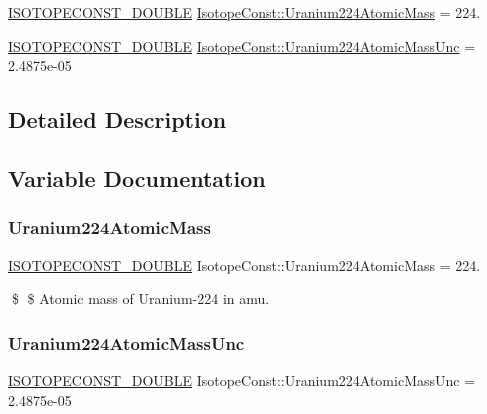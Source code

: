 \begin{DoxyCompactItemize}
\item 
\mbox{\hyperlink{group___isotope_const-_macros_ga8f45a7272ce02c0b4c65c44636ed719a}{I\+S\+O\+T\+O\+P\+E\+C\+O\+N\+S\+T\+\_\+\+D\+O\+U\+B\+LE}} \mbox{\hyperlink{group___isotope_const-_uranium-_u224_ga77f0c824e7cd9c7e3717377c4087f174}{Isotope\+Const\+::\+Uranium224\+Atomic\+Mass}} = 224.
\item 
\mbox{\hyperlink{group___isotope_const-_macros_ga8f45a7272ce02c0b4c65c44636ed719a}{I\+S\+O\+T\+O\+P\+E\+C\+O\+N\+S\+T\+\_\+\+D\+O\+U\+B\+LE}} \mbox{\hyperlink{group___isotope_const-_uranium-_u224_gafb72c0f823a90fe17beb9a0cf1f7412c}{Isotope\+Const\+::\+Uranium224\+Atomic\+Mass\+Unc}} = 2.\+4875e-\/05
\end{DoxyCompactItemize}


\subsection{Detailed Description}


\subsection{Variable Documentation}
\mbox{\label{group___isotope_const-_uranium-_u224_ga77f0c824e7cd9c7e3717377c4087f174}} 
\subsubsection{\texorpdfstring{Uranium224\+Atomic\+Mass}{Uranium224AtomicMass}}
{\footnotesize\ttfamily \mbox{\hyperlink{group___isotope_const-_macros_ga8f45a7272ce02c0b4c65c44636ed719a}{I\+S\+O\+T\+O\+P\+E\+C\+O\+N\+S\+T\+\_\+\+D\+O\+U\+B\+LE}} Isotope\+Const\+::\+Uranium224\+Atomic\+Mass = 224.}

\$ \$ Atomic mass of Uranium-\/224 in amu. \mbox{\label{group___isotope_const-_uranium-_u224_gafb72c0f823a90fe17beb9a0cf1f7412c}} 
\subsubsection{\texorpdfstring{Uranium224\+Atomic\+Mass\+Unc}{Uranium224AtomicMassUnc}}
{\footnotesize\ttfamily \mbox{\hyperlink{group___isotope_const-_macros_ga8f45a7272ce02c0b4c65c44636ed719a}{I\+S\+O\+T\+O\+P\+E\+C\+O\+N\+S\+T\+\_\+\+D\+O\+U\+B\+LE}} Isotope\+Const\+::\+Uranium224\+Atomic\+Mass\+Unc = 2.\+4875e-\/05}

